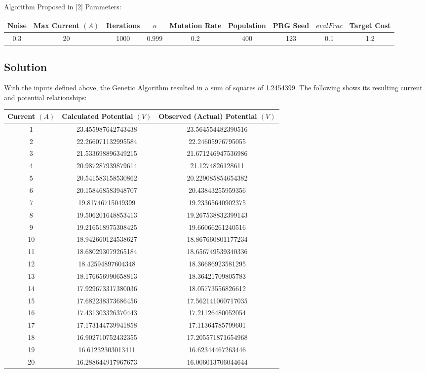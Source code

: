 \documentclass{article}
\begin{document}
Algorithm Proposed in [2] Parameters:
\begin{center}
\begin{tabular}{| c | c | c | c | c | c | c | c | c |} 
\hline
Noise & Max Current $(A)$ & Iterations & $\alpha$ & Mutation Rate & Population & PRG Seed & $evalFrac$ & Target Cost \\ 
\hline
0.3 & 20 & 1000 & 0.999 & 0.2 & 400 & 123 & 0.1 & 1.2 \\ 
\hline
\end{tabular}
\end{center}

\subsection{Solution}

With the inputs defined above, the Genetic Algorithm resulted in a sum of squares of 1.2454399. The following shows its resulting current and potential relationships:
\begin{center}
\begin{tabular}{| c | c | c |} 
\hline
Current $(A)$ & Calculated Potential $(V)$ & Observed (Actual) Potential $(V)$\\ 
\hline
1 & 23.455987642743438 & 23.564554482390516 \\ 
2 & 22.266071132995584 & 22.24605976795055 \\ 
3 & 21.533698896349215 & 21.671246947536986\\ 
4 & 20.987287939879614 & 21.1274826128611 \\ 
5 & 20.541583158530862 & 20.229085854654382 \\ 
6 & 20.158468583948707 & 20.43843255959356 \\ 
7 & 19.81746715049399 & 19.23365640902375 \\ 
8 & 19.506201648853413 & 19.267538832399143 \\ 
9 & 19.216518975308425 & 19.66066261240516 \\ 
10 & 18.942660124538627 & 18.867660801177234 \\ 
11 & 18.680293079265184 & 18.656749539340336 \\ 
12 & 18.42594897604348 & 18.36686923581295 \\ 
13 & 18.176656990658813 & 18.36421709805783 \\ 
14 & 17.929673317380036 & 18.05773556826612 \\ 
15 & 17.682238373686456 & 17.562141060717035 \\ 
16 & 17.431303326370443 & 17.21126480052054 \\ 
17 & 17.173144739941858 & 17.11364785799601 \\ 
18 & 16.902710752432355 & 17.205571871654968 \\ 
19 & 16.61232303013411 & 16.62344467263446 \\ 
20 & 16.288644917967673 & 16.006013706044644 \\ 
\hline
\end{tabular}
\end{center}
\end{document}
